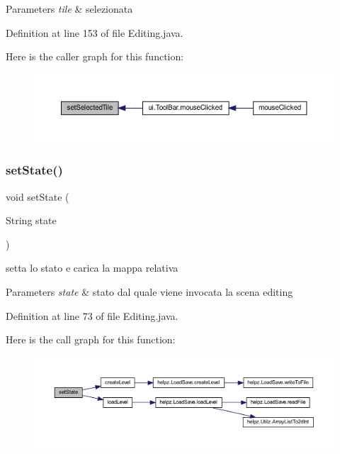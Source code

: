 \begin{DoxyParams}{Parameters}
{\em tile} & selezionata \\
\hline
\end{DoxyParams}


Definition at line 153 of file Editing.\+java.

Here is the caller graph for this function\+:\nopagebreak
\begin{figure}[H]
\begin{center}
\leavevmode
\includegraphics[width=350pt]{classscenes_1_1_editing_adaa2adb9d249f9b235fb9bb96aed4924_icgraph}
\end{center}
\end{figure}
\mbox{\label{classscenes_1_1_editing_ae646a5c5937b560efaa2b7bb675bc3cd}} 
\subsubsection{\texorpdfstring{set\+State()}{setState()}}
{\footnotesize\ttfamily void set\+State (\begin{DoxyParamCaption}\item[{String}]{state }\end{DoxyParamCaption})}



setta lo stato e carica la mappa relativa 


\begin{DoxyParams}{Parameters}
{\em state} & stato dal quale viene invocata la scena editing \\
\hline
\end{DoxyParams}


Definition at line 73 of file Editing.\+java.

Here is the call graph for this function\+:
\nopagebreak
\begin{figure}[H]
\begin{center}
\leavevmode
\includegraphics[width=350pt]{classscenes_1_1_editing_ae646a5c5937b560efaa2b7bb675bc3cd_cgraph}
\end{center}
\end{figure}


